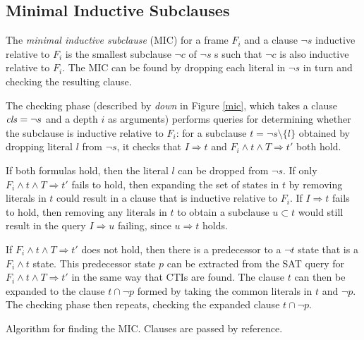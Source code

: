 \documentclass[12pt,a4paper,twoside,openright]{report}
\begin{document}
{{\subsection{Minimal Inductive Subclauses}
The \emph{minimal inductive subclause} (MIC) for a frame $F_i$ and a clause $\neg s$
inductive relative to $F_i$
is the smallest subclause $\neg c$ of $\neg s$ s such that
$\neg c$ is also inductive relative to $F_i$.
The MIC can be found by dropping each literal
in $\neg s$ in turn and checking the resulting clause.

The checking phase (described by {\it down} in Figure \ref{mic},
which takes a clause ${\it cls} = \neg s$ and a depth $i$ as arguments)
performs queries
for determining whether the subclause is inductive relative to
$F_i$: for a subclause $t = \neg s \setminus \{l\}$ obtained by dropping
literal $l$ from $\neg s$, it checks that
$I \Rightarrow t$ and $F_i \wedge t \wedge T \Rightarrow t'$ both hold.

If both formulas hold, then the literal $l$ can be dropped from $\neg s$.
If only $F_i \wedge t \wedge T \Rightarrow t'$ fails to hold, then
expanding the set of states in $t$ by removing %
literals in $t$ could result in a clause that is inductive relative to $F_i$.
If $I \Rightarrow t$ fails to hold, then removing any literals in $t$ to
obtain a subclause $u \subset t$ would still result in the query $I \Rightarrow u$
failing, since $u \Rightarrow t$ holds.

If $F_i \wedge t \wedge T \Rightarrow t'$ does not hold, then
there is a predecessor to a $\neg t$ state that is a $F_i \wedge t$ state.
This predecessor state $p$ can be extracted from the SAT query for
$F_i \wedge t \wedge T \Rightarrow t'$ in the same way that CTIs are found.
The clause $t$ can then be expanded to the clause $t \cap \neg p$
formed by taking the common literals in $t$ and $\neg p$.
The checking phase then repeats, checking the expanded clause $t \cap \neg p$.

\begin{algorithm}[t]
\DontPrintSemicolon
{}
\caption{Algorithm for finding the MIC. Clauses are
passed by reference.}
\label{mic}
\end{algorithm}

}}
\end{document}
